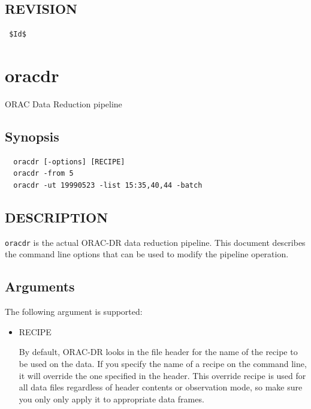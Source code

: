 \documentclass[twoside,11pt]{article}
\renewcommand{\_}{\texttt{\symbol{95}}}
\begin{document}
\subsection*{REVISION\label{Xoracdr_REVISION}}
\begin{verbatim}
 $Id$
\end{verbatim}

\section{oracdr\label{oracdr}}


ORAC Data Reduction pipeline

\subsection*{Synopsis\label{oracdr_Synopsis}}
\begin{verbatim}
  oracdr [-options] [RECIPE]
  oracdr -from 5
  oracdr -ut 19990523 -list 15:35,40,44 -batch
\end{verbatim}
\subsection*{DESCRIPTION\label{oracdr_DESCRIPTION}}


\texttt{oracdr} is the actual ORAC-DR data reduction pipeline. 
This document describes the command line options that
can be used to modify the pipeline operation.

\subsection*{Arguments\label{oracdr_Arguments}}


The following argument  is  supported:

\begin{itemize}

\item RECIPE

By default, ORAC-DR looks in the file header for the name of the
recipe to be used on the data. If you specify the name of a recipe on
the command line, it will override the one specified in the
header. This override recipe is used for all data files regardless of
header contents or observation mode, so make sure you only only apply
it to appropriate data frames.

\end{itemize}
\end{document}
